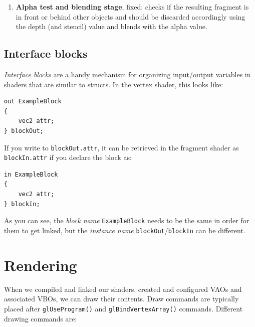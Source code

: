 \documentclass[table, xcdraw]{article}%
\begin{document}
\begin{enumerate}
    The fragment shader also has the \texttt{discard} command, which instructs the shader to stop processing and not output the fragment to the color buffer.
    
    The built-in \texttt{gl_FrontFacing} input variable is a \texttt{bool} that is \texttt{true} if the current fragment is part of a front face, and \texttt{false} otherwise.
    \item \textbf{Alpha test and blending stage}, fixed: checks if the resulting fragment is in front or behind other objects and should be discarded accordingly using the depth (and stencil) value and blends with the alpha value.
\end{enumerate}

\subsection{Interface blocks} \label{interface_block}

\emph{Interface blocks} are a handy mechanism for organizing input/output variables in shaders that are similar to structs. In the vertex shader, this looks like:

\begin{verbatim}
out ExampleBlock
{
    vec2 attr;
} blockOut;
\end{verbatim}

If you write to \texttt{blockOut.attr}, it can be retrieved in the fragment shader as \texttt{blockIn.attr} if you declare the block as:

\begin{verbatim}
in ExampleBlock
{
    vec2 attr;
} blockIn;
\end{verbatim}

As you can see, the \emph{block name} \texttt{ExampleBlock} needs to be the same in order for them to get linked, but the \emph{instance name} \texttt{blockOut}/\texttt{blockIn} can be different.

\section{Rendering}

When we compiled and linked our shaders, created and configured VAOs and associated VBOs, we can draw their contents. Draw commands are typically placed after \texttt{glUseProgram()} and \texttt{glBindVertexArray()} commands. Different drawing commands are:
\end{document}
